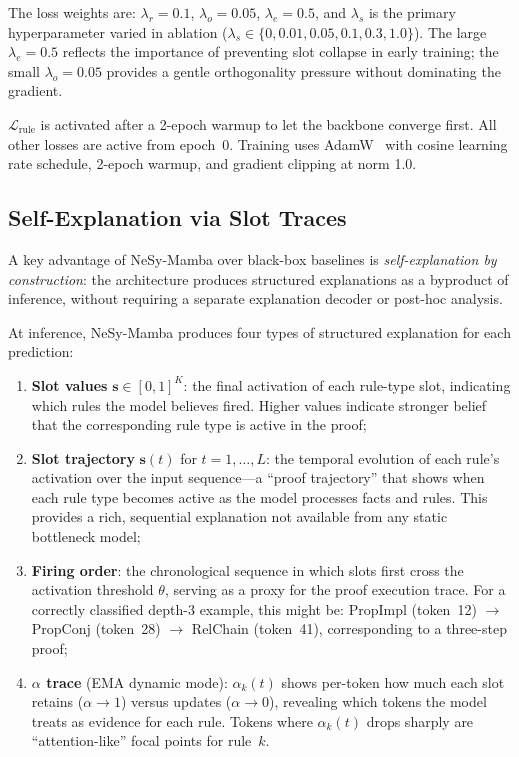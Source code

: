 \documentclass[conference]{IEEEtran}
\DeclareRobustCommand{\model}{NeSy-Mamba}
\begin{document}
The loss weights are:  $\lambda_r = 0.1$, $\lambda_o = 0.05$,
$\lambda_e = 0.5$, and $\lambda_s$ is the primary hyperparameter
varied in ablation ($\lambda_s \in \{0, 0.01, 0.05, 0.1, 0.3,
1.0\}$).  The large $\lambda_e = 0.5$ reflects the importance of
preventing slot collapse in early training; the small $\lambda_o
= 0.05$ provides a gentle orthogonality pressure without
dominating the gradient.

$\mathcal{L}_\text{rule}$ is activated after a 2-epoch warmup to
let the backbone converge first.  All other losses are active from
epoch~0.  Training uses AdamW~\cite{loshchilov2019adamw} with
cosine learning rate schedule, 2-epoch warmup, and gradient
clipping at norm 1.0.

\subsection{Self-Explanation via Slot Traces}
\label{sec:selfexplain}

A key advantage of \model{} over black-box baselines is
\emph{self-explanation by construction}: the architecture
produces structured explanations as a byproduct of inference,
without requiring a separate explanation decoder or post-hoc
analysis.

At inference, \model{} produces four types of structured
explanation for each prediction:
\begin{enumerate}[nosep]
    \item \textbf{Slot values} $\mathbf{s} \in [0,1]^K$:
          the final activation of each rule-type slot, indicating
          which rules the model believes fired.  Higher values
          indicate stronger belief that the corresponding rule
          type is active in the proof;
    \item \textbf{Slot trajectory} $\mathbf{s}(t)$ for
          $t = 1, \dots, L$: the temporal evolution of each rule's
          activation over the input sequence---a ``proof
          trajectory'' that shows when each rule type becomes
          active as the model processes facts and rules.  This
          provides a rich, sequential explanation not available
          from any static bottleneck model;
    \item \textbf{Firing order}: the chronological sequence in
          which slots first cross the activation threshold
          $\theta$, serving as a proxy for the proof execution
          trace.  For a correctly classified depth-3 example, this
          might be: PropImpl (token~12) $\to$ PropConj (token~28)
          $\to$ RelChain (token~41), corresponding to a three-step
          proof;
    \item \textbf{$\alpha$ trace} (EMA dynamic mode):
          $\alpha_k(t)$ shows per-token how much each slot
          retains ($\alpha \to 1$) versus updates ($\alpha \to 0$),
          revealing which tokens the model treats as evidence for
          each rule.  Tokens where $\alpha_k(t)$ drops sharply
          are ``attention-like'' focal points for rule~$k$.
\end{enumerate}
\end{document}
